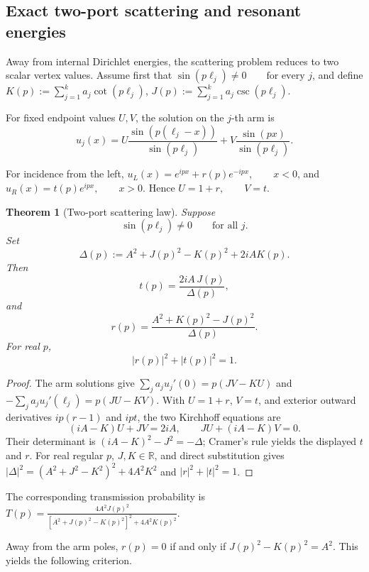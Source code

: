 \documentclass[11pt]{article}
\theoremstyle{plain}
\newtheorem{theorem}{Theorem}[section]
\theoremstyle{definition}
\begin{document}
\subsection{Exact two-port scattering and resonant energies}
\label{subsec:split-rejoin-exact-scattering}
\label{subsec:split-rejoin-perfect-transmission}
\label{subsec:split-rejoin-zeros}

Away from internal Dirichlet energies, the scattering problem reduces to
two scalar vertex values. Assume first that
\(\sin(p\ell_j)\neq0 \qquad \text{for every }j\),
and define
\(K(p) := \sum_{j=1}^{k} a_j\cot(p\ell_j)\),
\(J(p) := \sum_{j=1}^{k} a_j\csc(p\ell_j)\).

For fixed endpoint values \(U,V\), the solution on the \(j\)-th arm is
\[
  u_j(x)
  =
  U
  \frac{\sin(p(\ell_j-x))}
       {\sin(p\ell_j)}
  +
  V
  \frac{\sin(px)}
       {\sin(p\ell_j)}.
\]

For incidence from the left,
\(u_L(x) = e^{ipx}+r(p)e^{-ipx}, \qquad x<0\),
and
\(u_R(x) = t(p)e^{ipx}, \qquad x>0\).
Hence
\(U=1+r, \qquad V=t\).

\begin{theorem}[Two-port scattering law]
\label{thm:split-rejoin-exact-S}
Suppose
\[
  \sin(p\ell_j)\neq0
  \qquad
  \text{for all }j.
\]
Set
\[
  \Delta(p)
  :=
  A^2+J(p)^2-K(p)^2+2iAK(p).
\]
Then
\[
  t(p)
  =
  \frac{2iA\,J(p)}{\Delta(p)},
\]
and
\[
  r(p)
  =
  \frac{A^2+K(p)^2-J(p)^2}{\Delta(p)}.
\]
For real \(p\),
\[
  |r(p)|^2+|t(p)|^2=1.
\]
\end{theorem}

\begin{proof}
The arm solutions give
\(\sum_j a_ju_j'(0)=p(JV-KU)\) and \(-\sum_j a_ju_j'(\ell_j)=p(JU-KV)\). With \(U=1+r\), \(V=t\), and exterior outward derivatives \(ip(r-1)\) and \(ipt\), the two Kirchhoff equations are
\[
 (iA-K)U+JV=2iA,\qquad JU+(iA-K)V=0.
\]
Their determinant is \((iA-K)^2-J^2=-\Delta\); Cramer's rule yields the displayed \(t\) and \(r\). For real regular \(p\), \(J,K\in\mathbb R\), and direct substitution gives
\( |\Delta|^2=(A^2+J^2-K^2)^2+4A^2K^2 \) and \(|r|^2+|t|^2=1\).
\end{proof}

The corresponding transmission probability is
\(T(p) = \frac{ 4A^2J(p)^2 }{ \left[ A^2+J(p)^2-K(p)^2 \right]^2 + 4A^2K(p)^2 }\).

Away from the arm poles, \(r(p)=0\) if and only if
\(J(p)^2-K(p)^2=A^2\).
This yields the following criterion.
\end{document}
